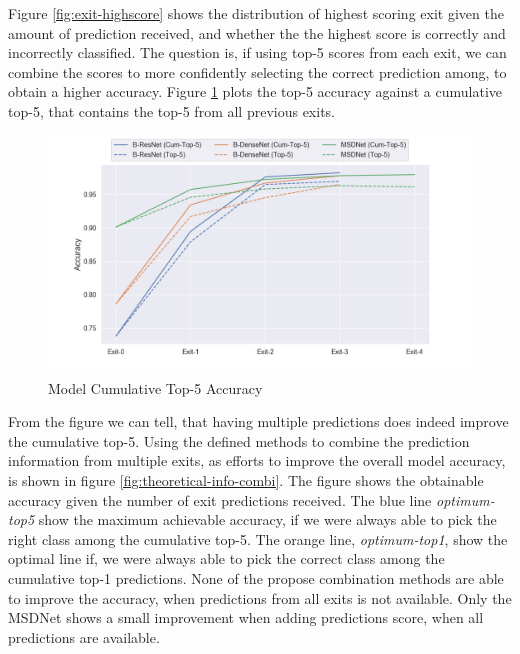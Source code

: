 Figure \ref{fig:exit-highscore} shows the distribution of highest scoring exit given the amount of prediction received, and whether the the highest score is correctly and incorrectly classified. The question is, if using top-5 scores from each exit, we can combine the scores to more confidently selecting the correct prediction among, to obtain a higher accuracy. Figure \ref{fig:top-5-cumulative} plots the top-5 accuracy against a cumulative top-5, that contains the top-5 from all previous exits. 

\begin{figure}
	\centering
	\includegraphics[width=\linewidth]{figures/edge/top5cumulative}
	\caption[Top-5 Cumulative]{Model Cumulative Top-5 Accuracy}
	\label{fig:top-5-cumulative}
\end{figure}

From the figure we can tell, that having multiple predictions does indeed improve the cumulative top-5. Using the defined methods to combine the prediction information from multiple exits, as efforts to improve the overall model accuracy, is shown in figure \ref{fig:theoretical-info-combi}. The figure shows the obtainable accuracy given the number of exit predictions received. The blue line \textit{optimum-top5} show the maximum achievable accuracy, if we were always able to pick the right class among the cumulative top-5. The orange line, \textit{optimum-top1}, show the optimal line if, we were always able to pick the correct class among the cumulative top-1 predictions. None of the propose combination methods are able to improve the accuracy, when predictions from all exits is not available. Only the MSDNet shows a small improvement when adding predictions score, when all predictions are available.

